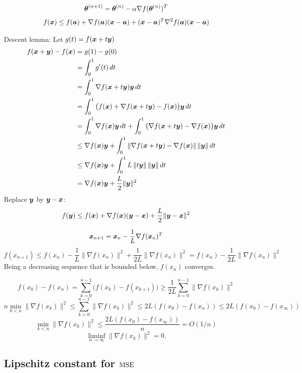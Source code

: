 \documentclass[12pt]{amsart}
\begin{document}
\[
    \boldsymbol{\theta}^{(n+1)} = \boldsymbol{\theta}^{(n)} - \alpha \nabla f(\boldsymbol{\theta}^{(n)})^T
\]
\[
f(\boldsymbol{x}) \leq f(\boldsymbol{a}) + \nabla f(\boldsymbol{a})(\boldsymbol{x}-\boldsymbol{a}) + (\boldsymbol{x} - \boldsymbol{a})^T\nabla^2 f(\boldsymbol{a})(\boldsymbol{x} - \boldsymbol{a})
\]

Descent lemma: Let $g(t) = f(\boldsymbol{x} + t\boldsymbol{y})$
\begin{align*}
    f(\boldsymbol{x} + \boldsymbol{y}) - f(\boldsymbol{x}) &=g(1) - g(0)\\ 
    &= \int_0^1 g'(t)\,dt\\
    &= \int_0^1\nabla f(\boldsymbol{x} + t \boldsymbol{y})\boldsymbol{y}\,dt\\
    &= \int_0^1\big(f(\boldsymbol{x}) + \nabla f(\boldsymbol{x} + t \boldsymbol{y}) - f(\boldsymbol{x})\big)\boldsymbol{y}\,dt\\
    &= \int_0^1\nabla f(\boldsymbol{x})\boldsymbol{y}\,dt + \int_0^1\big(\nabla f(\boldsymbol{x} + t \boldsymbol{y}) - \nabla f(\boldsymbol{x})\big)\boldsymbol{y}\,dt\\
    &\leq \nabla f(\boldsymbol{x})\boldsymbol{y} + \int_0^1\left\|\nabla f(\boldsymbol{x} + t \boldsymbol{y}) - \nabla f(\boldsymbol{x})\right\|\|\boldsymbol{y}\|\,dt\\
    &\leq \nabla f(\boldsymbol{x})\boldsymbol{y} + \int_0^1 L\left\|t\boldsymbol{y}\right\|\|\boldsymbol{y}\|\,dt\\
    &= \nabla f(\boldsymbol{x})\boldsymbol{y} + \frac{L}2\|\boldsymbol{y}\|^2 
\end{align*}
Replace $\boldsymbol{y}$ by $\boldsymbol{y} - \boldsymbol{x}$:
\[
    f(\boldsymbol{y}) \leq f(\boldsymbol{x}) + \nabla f(\boldsymbol{x})(\boldsymbol{y} - \boldsymbol{x}) + \frac L 2\|\boldsymbol{y} - \boldsymbol{x}\|^2
\]

\[
    \boldsymbol{x}_{n+1} = \boldsymbol{x}_n - \frac1L\nabla f(\boldsymbol{x}_n)^T
\]
\[
    f(x_{n+1})\leq f(x_n) - \frac1L \|\nabla f(x_n)\|^2 + \frac1{2L} \|\nabla f(x_n)\|^2 
    = f(x_n) - \frac1{2L} \|\nabla f(x_n)\|^2
\]
Being a decreasing sequence that is bounded below, $f(x_n)$ converges.

\[
    f(x_0) - f(x_n) = \sum_{k=0}^{n-1} \big(f(x_k) - f(x_{k+1})\big)
    \geq \frac1{2L}\sum_{k=0}^{n-1}\|\nabla f(x_k)\|^2
\]
\[
    n\min_{k<n} \|\nabla f(x_k)\|^2 \leq\sum_{k=0}^{n-1}\|\nabla f(x_k)\|^2\leq 2L(f(x_0) - f(x_n))\leq 2L(f(x_0) - f(x_\infty))
\]
\[
    \min_{k<n} \|\nabla f(x_k)\|^2\leq \frac{2L(f(x_0) - f(x_\infty))}{n} = O(1/n)
\]
\[
    \liminf_{n\to\infty} \|\nabla f(x_k)\|^2 = 0.
\]

\subsection{Lipschitz constant for $\operatorname{MSE}$}
\end{document}
